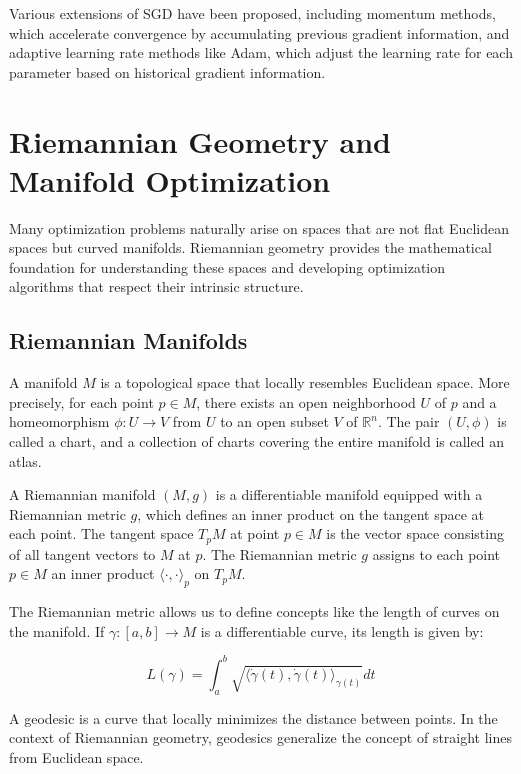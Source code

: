 Various extensions of SGD have been proposed, including momentum methods, which accelerate convergence by accumulating previous gradient information, and adaptive learning rate methods like Adam, which adjust the learning rate for each parameter based on historical gradient information.

\section{Riemannian Geometry and Manifold Optimization}

Many optimization problems naturally arise on spaces that are not flat Euclidean spaces but curved manifolds. Riemannian geometry provides the mathematical foundation for understanding these spaces and developing optimization algorithms that respect their intrinsic structure.

\subsection{Riemannian Manifolds}

A manifold $M$ is a topological space that locally resembles Euclidean space. More precisely, for each point $p \in M$, there exists an open neighborhood $U$ of $p$ and a homeomorphism $\phi: U \rightarrow V$ from $U$ to an open subset $V$ of $\mathbb{R}^n$. The pair $(U, \phi)$ is called a chart, and a collection of charts covering the entire manifold is called an atlas.

A Riemannian manifold $(M, g)$ is a differentiable manifold equipped with a Riemannian metric $g$, which defines an inner product on the tangent space at each point. The tangent space $T_p M$ at point $p \in M$ is the vector space consisting of all tangent vectors to $M$ at $p$. The Riemannian metric $g$ assigns to each point $p \in M$ an inner product $\langle \cdot, \cdot \rangle_p$ on $T_p M$.

The Riemannian metric allows us to define concepts like the length of curves on the manifold. If $\gamma: [a, b] \rightarrow M$ is a differentiable curve, its length is given by:

\begin{equation}
L(\gamma) = \int_a^b \sqrt{\langle \dot{\gamma}(t), \dot{\gamma}(t) \rangle_{\gamma(t)}} dt
\end{equation}

A geodesic is a curve that locally minimizes the distance between points. In the context of Riemannian geometry, geodesics generalize the concept of straight lines from Euclidean space.

